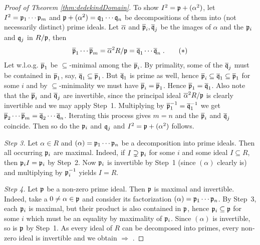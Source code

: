 \documentclass[a4paper,parskip=half,numbers=enddot, DIV=12]{scrreprt}
\begin{document}
\begin{proof}[Proof of Theorem \ref{thm:dedekindDomain}]
To show $I^2=\mathfrak{p}+(\alpha^2)$, let $I^2=\mathfrak{p}_1\cdots \mathfrak{p}_m$ and $\mathfrak{p}+(\alpha^2)=\mathfrak{q}_1\cdots\mathfrak{q}_n$ be decompositions of them into (not necessarily distinct) prime ideals. Let $\overline \alpha$ and $\overline{\mathfrak{p}}_i,\overline{\mathfrak{q}}_j$ be the images of $\alpha$ and the $\mathfrak{p}_i$ and $\mathfrak{q}_j$ in $R/\mathfrak{p}$, then
\begin{align}\lbl{eq:decompInR/p}
	\ov \pp_1\cdots \ov \pp_m=\ov \alpha^2R/\pp=\ov \qq_1\cdots\ov \qq_n\;.\tag{$*$}
\end{align}
Let w.l.o.g. $\overline {\mathfrak{p}}_1$ be $\subseteq$-minimal among the $\overline {\mathfrak{p}}_i$. By primality, some of the $\overline {\mathfrak{q}}_j$ must be contained in $\overline {\mathfrak{p}}_1$, say, $\overline {\mathfrak{q}}_1\subseteq \overline {\mathfrak{p}}_1$. But $\overline {\mathfrak{q}}_1$ is prime as well, hence $\overline {\mathfrak{p}}_i\subseteq \overline {\mathfrak{q}}_1\subseteq \overline {\mathfrak{p}}_1$ for some $i$ and by $\subseteq$-minimality we must have $\overline {\mathfrak{p}}_i=\overline {\mathfrak{p}}_1$. Hence $\overline {\mathfrak{p}}_1=\overline {\mathfrak{q}}_1$. Also note that the $\overline {\mathfrak{p}}_i$ and $\overline {\mathfrak{q}}_j$ are invertible, since the principal ideal $\overline \alpha^2R/\mathfrak{p}$ is clearly invertible and we may apply Step~1. Multiplying  by $\overline {\mathfrak{p}}_1^{-1}=\overline {\mathfrak{q}}_1^{-1}$ we get $\overline {\mathfrak{p}}_2\cdots \overline {\mathfrak{p}}_m=\overline {\mathfrak{q}}_2\cdots \overline {\mathfrak{q}}_n$. Iterating this process gives $m=n$ and the $\overline {\mathfrak{p}}_i$ and $\overline {\mathfrak{q}}_j$ coincide. Then so do the $\mathfrak{p}_i$ and $\mathfrak{q}_j$ and $I^2=\mathfrak{p}+(\alpha^2)$ follows.

\emph{Step 3.} Let $\alpha\in R$ and $(\alpha)=\mathfrak{p}_1\cdots \mathfrak{p}_n$ be a decomposition into prime ideals. Then all occurring $\mathfrak{p}_i$ are maximal. Indeed, if $I\supsetneq \mathfrak{p}_i$ for some $i$ and some ideal $I\subseteq R$, then $\mathfrak{p}_iI=\mathfrak{p}_i$ by Step~2. Now $\mathfrak{p}_i$ is invertible by Step~1 (since $(\alpha)$ clearly is) and multiplying by $\mathfrak{p}_i^{-1}$ yields $I=R$.

\emph{Step 4.} Let $\mathfrak{p}$ be a non-zero prime ideal. Then $\mathfrak{p}$ is maximal and invertible. Indeed, take a $0\neq \alpha\in\mathfrak{p}$ and consider its factorization $(\alpha)=\mathfrak{p}_1\cdots \mathfrak{p}_n$. By Step~3, each $\mathfrak{p}_i$ is maximal, but their product is also contained in $\mathfrak{p}$, hence $\mathfrak{p}_i\subseteq\mathfrak{p}$ for some $i$ which must be an equality by maximality of $\mathfrak{p}_i$. Since $(\alpha)$ is invertible, so is $\mathfrak{p}$ by Step~1. As every ideal of $R$ can be decomposed into primes, every non-zero ideal is invertible and we obtain  $\Rightarrow$ .
\end{proof}
\end{document}
